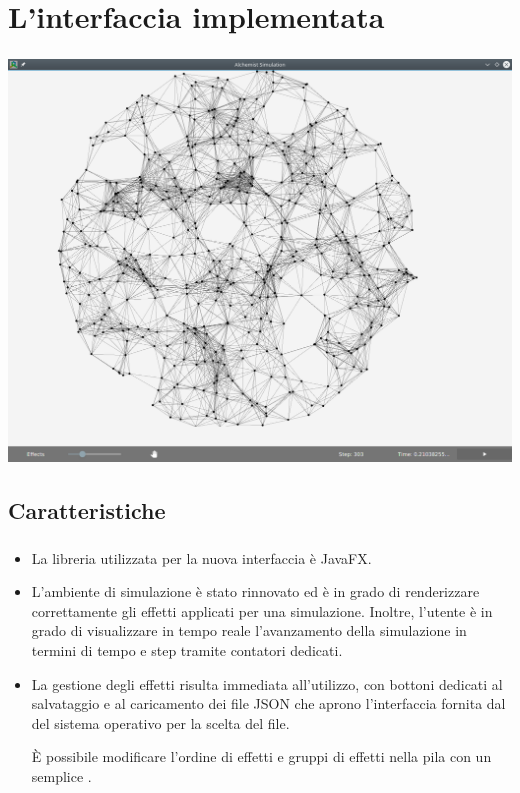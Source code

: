 
\section{L'interfaccia implementata}\label{sec:new}

\begin{frame}
    \frametitle{\insertsection}
    \centering
    \includegraphics[scale=0.27]{img/new/window_all}
\end{frame}

\subsection{Caratteristiche}\label{subsec:feature}
\begin{frame}
    \frametitle{\insertsection}
    \framesubtitle{\insertsubsection}
    \begin{itemize}[<+(1)->]
        \item
            La libreria utilizzata per la nuova interfaccia è JavaFX.
        \item
            L'ambiente di simulazione è stato rinnovato ed è in grado di renderizzare correttamente gli effetti applicati per una simulazione.
            Inoltre, l'utente è in grado di visualizzare in tempo reale l'avanzamento della simulazione in termini di tempo e step tramite contatori dedicati.

        \item
            La gestione degli effetti risulta immediata all'utilizzo, con bottoni dedicati al salvataggio e al caricamento dei file JSON che aprono l'interfaccia fornita dal  del sistema operativo per la scelta del file.

            È possibile modificare l'ordine di effetti e gruppi di effetti nella pila con un semplice .
    \end{itemize}
\end{frame}

